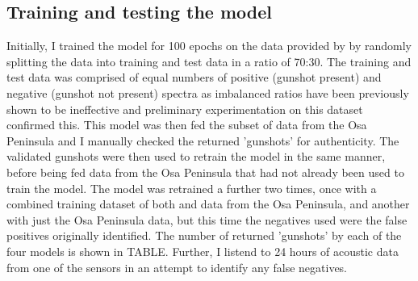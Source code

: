 \subsection{Training and testing the model}
Initially, I trained the model for 100 epochs on the data provided by \cite{Hill2018} by randomly splitting the data into training and test data in a ratio of 70:30. The training and test data was comprised of equal numbers of positive (gunshot present) and negative (gunshot not present) spectra as imbalanced ratios have been previously shown to be ineffective \citep{Kim2018} and preliminary experimentation on this dataset confirmed this. This model was then fed the subset of data from the Osa Peninsula and I manually checked the returned 'gunshots' for authenticity. The validated gunshots were then used to retrain the model in the same manner, before being fed data from the Osa Peninsula that had not already been used to train the model. The model was retrained a further two times, once with a combined training dataset of both \cite{Hill2018} and data from the Osa Peninsula, and another with just the Osa Peninsula data, but this time the negatives used were the false positives originally identified. The number of returned 'gunshots' by each of the four models is shown in TABLE. Further, I listend to 24 hours of acoustic data from one of the sensors in an attempt to identify any false negatives.
